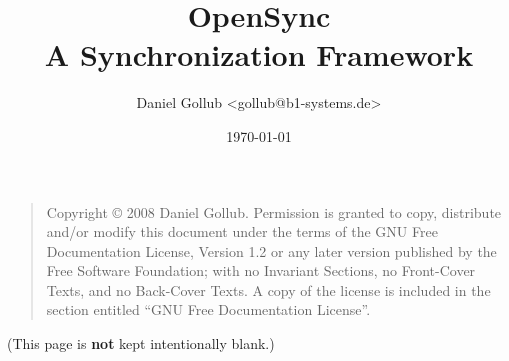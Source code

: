 \documentclass[a4paper,10pt,oneside,openright,openbib]{report}
\author{
Daniel Gollub <gollub@b1-systems.de>\\
}
\title{\huge{OpenSync}\\\large{A Synchronization Framework}}
\date{\today}
\begin{document}
\maketitle

\begin{quote}
Copyright \copyright{}  2008  Daniel Gollub.
Permission is granted to copy, distribute and/or modify this document
under the terms of the GNU Free Documentation License, Version 1.2
or any later version published by the Free Software Foundation;
with no Invariant Sections, no Front-Cover Texts, and no Back-Cover Texts.
A copy of the license is included in the section entitled ``GNU
Free Documentation License''. 
\end{quote}

\vfill
\begin{center}
(This page is \textbf{not} kept intentionally blank.)
\end{center}
\vfill

\tableofcontents

\newpage



















\appendix




\end{document}
